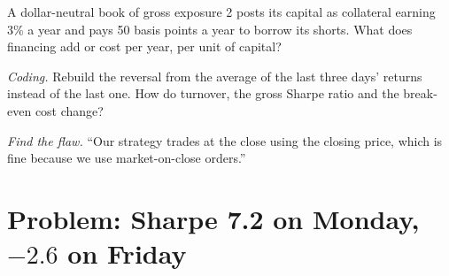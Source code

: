 \begin{exercise}[$\star\star$]\label{exo:rs:vectorised-backtests:6}
A dollar-neutral book of gross exposure 2 posts its capital as collateral earning 3\% a year and pays 50 basis points a year to borrow its shorts. What
does financing add or cost per year, per unit of capital?
\end{exercise}

\begin{exercise}[$\star\star\star$]\label{exo:rs:vectorised-backtests:7}
\emph{Coding.} Rebuild the reversal from the average of the last three days' returns instead of the last one. How do turnover, the gross Sharpe ratio and
the break-even cost change?
\end{exercise}

\begin{exercise}[$\star\star\star$]\label{exo:rs:vectorised-backtests:8}
\emph{Find the flaw.} ``Our strategy trades at the close using the closing price, which is fine because we use market-on-close orders.''
\end{exercise}

\section{Problem: Sharpe 7.2 on Monday, $-2.6$ on Friday}

